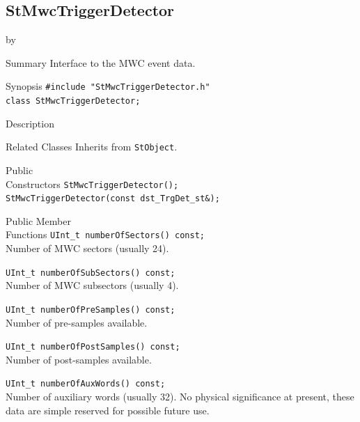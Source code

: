 \documentclass[twoside]{article}
\newcommand{\entrylabel}[1]{\mbox{\textbf{{#1}}}\hfil}%
\newenvironment{entry}
{\begin{list}{}%
    {\renewcommand{\makelabel}{\entrylabel}%
     \setlength{\labelwidth}{90pt}%
     \setlength{\leftmargin}{\labelwidth}
     \advance\leftmargin by \labelsep%
      }%
    }%
  {\end{list}}
\newcommand{\Entrylabel}[1]%
{\raisebox{0pt}[1ex][0pt]{\makebox[\labelwidth][l]%
    {\parbox[t]{\labelwidth}{\hspace{0pt}\textbf{{#1}}}}}}
\newenvironment{Entry}%
{\renewcommand{\entrylabel}{\Entrylabel}\begin{entry}}%
  {\end{entry}}
\begin{document}
\subsection{StMwcTriggerDetector}
\label{sec:StMwcTriggerDetector}
\begin{Entry}
\item[Summary]
    Interface to the MWC event data.
    
\item[Synopsis]
    \verb+#include "StMwcTriggerDetector.h"+\\
    \verb+class StMwcTriggerDetector;+\\
    
\item[Description]

\item[Related Classes]
    Inherits from \texttt{StObject}.
    
\item[Public\\ Constructors]
    \verb+StMwcTriggerDetector();+\\
    \verb+StMwcTriggerDetector(const dst_TrgDet_st&);+\\
    
\item[Public Member\\ Functions]
    \verb+UInt_t numberOfSectors() const;+\\
    Number of MWC sectors (usually 24).
    
    \verb+UInt_t numberOfSubSectors() const;+\\
    Number of MWC subsectors (usually 4).
    
    \verb+UInt_t numberOfPreSamples() const;+\\
    Number of pre-samples available.
    
    \verb+UInt_t numberOfPostSamples() const;+\\
    Number of post-samples available.
    
    \verb+UInt_t numberOfAuxWords() const;+\\
    Number of auxiliary words (usually 32).  No physical significance
    at present, these data are simple reserved for possible future
    use.
    

\end{Entry}
\end{document}
